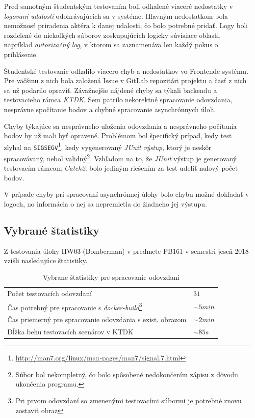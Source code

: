 \documentclass[
  digital, %
  oneside, %
  table,   %
  lof,     %
  lot,   %
]{fithesis3}
\begin{document}
Pred samotným študentským testovaním boli odhalené viaceré nedostatky v \emph{logovaní udalostí} odohrávajúcich sa v systéme. Hlavným nedostatkom bola nemožnosť priradenia aktéra k danej udalosti, čo bolo potrebné pridať. Logy boli rozdelené do niekoľkých súborov zoskupujúcich logicky súvisiace oblasti, napríklad \emph{autorizačný log}, v ktorom sa zaznamenáva len každý pokus o prihlásenie.

Študentské testovanie odhalilo viacero chyb a nedostatkov vo Frontende systému. Pre väčšinu z nich bola založená Issue v GitLab repozitári projektu a časť z nich sa už podarilo opraviť. Závažnejšie nájdené chyby sa týkali backendu a testovacieho rámca \emph{KTDK}. Sem patrilo nekorektné spracovanie odovzdania, nesprávne spočítanie bodov a chybné spracovanie asynchrónnych úloh.

Chyby týkajúce sa nesprávneho uloženia odovzdania a nesprávneho počítania bodov by už mali byť opravené. Problémom bol špecifický prípad, kedy test zlyhal na \texttt{SIGSEGV}\footnote{\url{http://man7.org/linux/man-pages/man7/signal.7.html}}, kedy vygenerovaný \emph{JUnit výstup}, ktorý je neskôr spracovávaný, nebol validný\footnote{Súbor bol nekompletný, čo bolo spôsobené nedokončením zápisu z dôvodu ukončenia programu.}. Vzhľadom na to, že \emph{JUnit} výstup je generovaný testovacím rámcom \emph{Catch2}, bolo jediným riešením za test udeliť nulový počet bodov.

V prípade chyby pri spracovaní asynchrónnej úlohy bolo chybu možné dohľadať v logoch, no informácia o nej sa nepremietla do žiadneho jej výstupu.

\subsection{Vybrané štatistiky}

Z testovania úlohy HW03 (Bomberman) v predmete PB161 v semestri jeseň 2018 vzišli nasledujúce štatistiky.

\begin{table}[h]
\begin{tabular}{l l}
Počet testovacích odovzdaní & $31$  \\
Čas potrebný pre spracovanie s \emph{docker-build}\footnote{Pri prvom odovzdaní so zmenenými testovacími súbormi je potrebné znovu zostaviť obraz} & $ \sim 5 min $ \\
Čas priemerný pre spracovanie odovzdania s exist. obrazom & $\sim 2 min$\\
Dĺžka behu testovacích scenárov v KTDK &  $\sim 85 s$ \\
\end{tabular}
\caption{Vybrane štatistiky pre spracovanie odovzdaní} \label{tab:proc-time-general}
\end{table}
\end{document}
